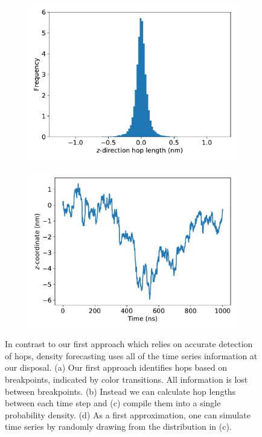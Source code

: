 \documentclass{article}
\begin{document}
\begin{figure}
\begin{subfigure}{0.49\linewidth}
  \includegraphics[width=\linewidth]{hop_density.pdf}
  \caption{}\label{fig:hop_density}
  \end{subfigure}
  \begin{subfigure}{0.49\linewidth}
  \includegraphics[width=\linewidth]{naive_density_forecast.pdf}
  \caption{}\label{fig:naive_density_forecast}
  \end{subfigure}
  \caption{In contrast to our first approach which relies on accurate 
  detection of hops, density forecasting uses all of the time series 
  information at our disposal. (a) Our first approach identifies hops 
  based on breakpoints, indicated by color transitions. All information 
  is lost between breakpoints. (b) Instead we can calculate hop lengths
  between each time step and (c) compile them into a single probability 
  density. (d) As a first approximation, one can simulate time series
  by randomly drawing from the distribution in (c).}\label{fig:density_forecast}
  \vspace{-1.5cm}
  \end{figure}  
  
\end{document}
